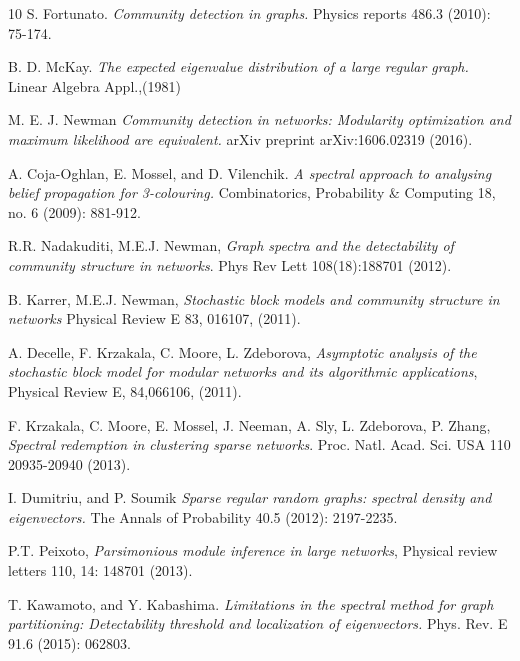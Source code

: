 \documentclass[%
 reprint,
 amsmath,amssymb,
 aps,
 pre,
 showpacs
]{revtex4-1}
\begin{document}
\begin{thebibliography}{10}
S. Fortunato. \textit{Community detection in graphs.} Physics reports 486.3 (2010): 75-174.

B. D. McKay. \textit{The expected eigenvalue distribution of a large regular graph.}  Linear Algebra Appl.,(1981)

 M. E. J. Newman \textit{Community detection in networks: Modularity optimization and maximum likelihood are equivalent.} arXiv preprint arXiv:1606.02319 (2016).

 A. Coja-Oghlan, E. Mossel, and D. Vilenchik. \textit{A spectral approach to analysing belief propagation for 3-colouring.} Combinatorics, Probability \& Computing 18, no. 6 (2009): 881-912.

 R.R. Nadakuditi, M.E.J. Newman, \textit{Graph spectra and the detectability of community structure in networks}. Phys Rev
Lett 108(18):188701 (2012).

B. Karrer, M.E.J. Newman, \textit{Stochastic block models
and community structure in networks} Physical Review E 83, 016107,
(2011).

A. Decelle, F. Krzakala, C. Moore, L. Zdeborova, \textit{Asymptotic
analysis of the stochastic block model for modular networks and its
algorithmic applications}, Physical Review E, 84,066106, (2011).

 F. Krzakala, C. Moore, E. Mossel, J. Neeman,
A. Sly, L. Zdeborova, P. Zhang, \textit{Spectral redemption in clustering
sparse networks}. Proc. Natl. Acad. Sci. USA 110 20935-20940 (2013).

I. Dumitriu, and P. Soumik \textit{Sparse regular random graphs: spectral density and eigenvectors.} The Annals of Probability 40.5 (2012): 2197-2235.

 P.T. Peixoto, \textit{Parsimonious module inference
in large networks}, Physical review letters 110, 14: 148701 (2013).

T. Kawamoto, and Y. Kabashima. \textit{Limitations in the spectral method for graph partitioning: Detectability threshold and localization of eigenvectors.} Phys. Rev. E 91.6 (2015): 062803.


\end{thebibliography}
\end{document}
